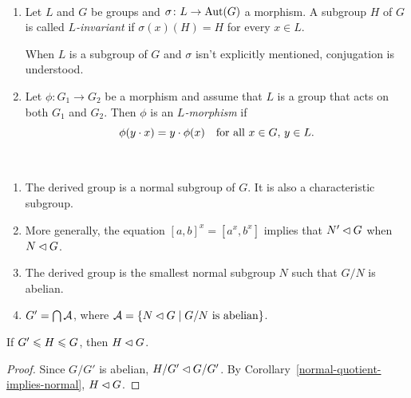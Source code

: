 \begin{defns}${}$
    \begin{enumerate}[\upshape-]
        \item Let\/ $L$ and $G$ be groups and\/ $\sigma\colon L\to{\rm Aut}(G)$ a morphism. A subgroup\/ $H$ of\/ $G$ is called \textsl{$L$-invariant} if\/ $\sigma(x)(H)=H$ for every\/ $x\in L$.
        
        When\/ $L$ is a subgroup of\/ $G$ and\/ $\sigma$ isn't explicitly mentioned, conjugation is understood.

        \item Let\/ $\phi\colon G_1\to G_2$ be a morphism and assume that\/ $L$ is a group that acts on both\/ $G_1$ and\/ $G_2$. Then\/ $\phi$ is an\/ \textsl{$L$-morphism} if
        $$
            \phi(y\cdot x) = y\cdot \phi(x)\quad\text{\upshape for all }x\in G,\, y\in L.
        $$
    \end{enumerate}
\end{defns}

\begin{rems}\label{derived-group}${}$
    \begin{enumerate}[\upshape i)]
        \item The derived group is a normal subgroup of\/ $G$. It is also a characteristic subgroup.

        \item More generally, the equation $[a,b]^x=[a^x,b^x]$ implies that $N'\lhd G$ when $N\lhd G$.

        \item The derived group is the smallest normal subgroup\/ $N$ such that\/ $G/N$ is abelian.

        \item $G'=\bigcap\cal A$, where ${\cal A}=\{N\lhd G\mid G/N \text{ \upshape is abelian}\}$.
    \end{enumerate}
\end{rems}

\begin{prop}
    If\/ $G'\leqslant H\leqslant G$, then\/ $H\lhd G$.
\end{prop}

\begin{proof} Since $G/G'$ is abelian, $H/G'\lhd G/G'$. By Corollary~\ref{normal-quotient-implies-normal}, $H\lhd G$.

\end{proof}

